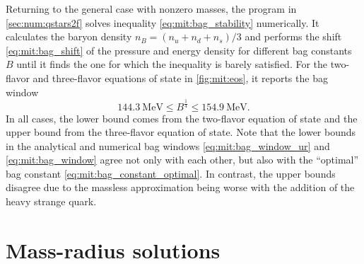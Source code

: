 Returning to the general case with nonzero masses,
the program in \cref{sec:num:qstars2f} solves inequality \eqref{eq:mit:bag_stability} numerically.
It calculates the baryon density $n_B = (n_u+n_d+n_s)/3$
and performs the shift \eqref{eq:mit:bag_shift} of the pressure and energy density for different bag constants $B$
until it finds the one for which the inequality is barely satisfied.
For the two-flavor and three-flavor equations of state in \cref{fig:mit:eos}, it reports the bag window
\begin{equation}
	\SI{144.3}{\mega\electronvolt} \leq B^\frac14 \leq \SI{154.9}{\mega\electronvolt} .
\label{eq:mit:bag_window}
\end{equation}
In all cases, the lower bound comes from the two-flavor equation of state and the upper bound from the three-flavor equation of state.
Note that the lower bounds in the analytical and numerical bag windows \eqref{eq:mit:bag_window_ur} and \eqref{eq:mit:bag_window}
agree not only with each other, but also with the ``optimal'' bag constant \eqref{eq:mit:bag_constant_optimal}.
In contrast, the upper bounds disagree due to the massless approximation being worse with the addition of the heavy strange quark.


\section{Mass-radius solutions}

